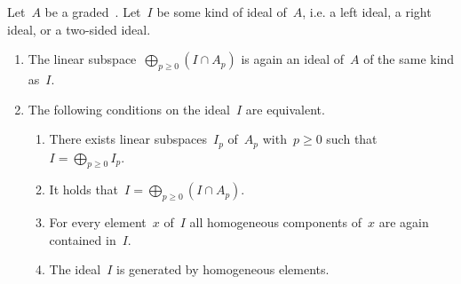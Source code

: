 \begin{lemma}
	\label{characterizations of homogeneous ideals}
	Let~$A$ be a graded~\algebra{$\kf$}.
	Let~$I$ be some kind of ideal of~$A$, i.e. a left ideal, a right ideal, or a two-sided ideal.
	\begin{enumerate}
		\item
			The linear subspace~$\bigoplus_{p \geq 0} {} (I \cap A_p)$ is again an ideal of~$A$ of the same kind as~$I$.
		\item
			The following conditions on the ideal~$I$ are equivalent.
			\begin{enumerate}
				\item
					\label{direct sum of linear subspaces}
					There exists linear subspaces~$I_p$ of~$A_p$ with~$p \geq 0$ such that~$I = \bigoplus_{p \geq 0} I_p$.
				\item
					\label{direct sum of intersections}
					It holds that~$I = \bigoplus_{p \geq 0} {} (I \cap A_p)$.
				\item
					\label{contains all homogeneous components}
					For every element~$x$ of~$I$ all homogeneous components of~$x$ are again contained in~$I$.
				\item
					\label{generated by homogeneous}
					The ideal~$I$ is generated by homogeneous elements.
			\end{enumerate}
	\end{enumerate}
\end{lemma}


